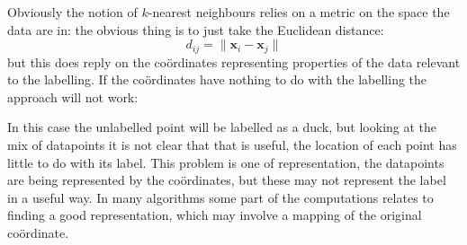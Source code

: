 \documentclass[12pt]{article}
\begin{document}
Obviously the notion of $k$-nearest neighbours relies on a metric on
the space the data are in: the obvious thing is to just take the Euclidean distance:
\begin{equation}
  d_{ij}=\|\mathbf{x}_i-\mathbf{x}_j\|
\end{equation}
but this does reply on the co\"{o}rdinates representing properties of
the data relevant to the labelling. If the co\"{o}rdinates have
nothing to do with the labelling the approach will not work:
\begin{center}
\end{center}
In this case the unlabelled point will be labelled as a duck, but
looking at the mix of datapoints it is not clear that that is useful,
the location of each point has little to do with its label. This
problem is one of representation, the datapoints are being represented
by the co\"{o}rdinates, but these may not represent the label in a
useful way. In many algorithms some part of the computations relates
to finding a good representation, which may involve a mapping of the
original co\"{o}rdinate.
\end{document}
